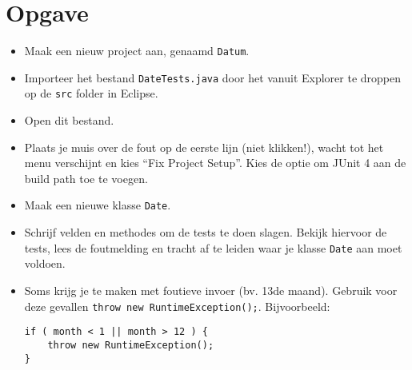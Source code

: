 \documentclass[a4paper]{article}
\begin{document}
\section{Opgave}
\begin{itemize}
  \item Maak een nieuw project aan, genaamd {\tt Datum}.
  \item Importeer het bestand {\tt DateTests.java} door het vanuit Explorer te droppen op de {\tt src} folder in Eclipse.
  \item Open dit bestand.
  \item Plaats je muis over de fout op de eerste lijn (niet klikken!), wacht tot het menu verschijnt en kies ``Fix Project Setup''. Kies de optie om JUnit 4 aan de build path toe te voegen.
  \item Maak een nieuwe klasse {\tt Date}.
  \item Schrijf velden en methodes om de tests te doen slagen. Bekijk hiervoor de tests, lees de foutmelding en tracht af te leiden waar je klasse {\tt Date} aan moet voldoen.
  \item Soms krijg je te maken met foutieve invoer (bv. 13de maand). Gebruik voor deze gevallen {\tt throw new RuntimeException();}. Bijvoorbeeld:
\begin{verbatim}
if ( month < 1 || month > 12 ) {
    throw new RuntimeException();
}
\end{verbatim}
\end{itemize}
\end{document}
